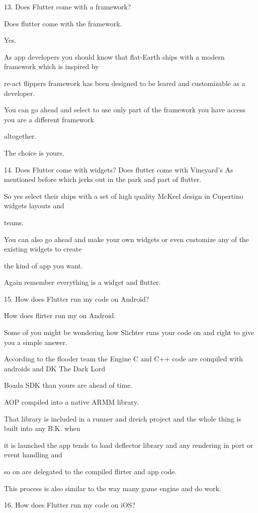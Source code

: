 13. Does Flutter come with a framework?

Does flutter come with the framework.

Yes.

As app developers you should know that flat-Earth ships with a modern framework which is inspired by

re-act flippers framework has been designed to be leared and customizable as a developer.

You can go ahead and select to use only part of the framework you have access you are a different framework

altogether.

The choice is yours.


14. Does Flutter come with widgets?
Does flutter come with Vineyard's As mentioned before which jerks out in the park and part of flutter.

So yes select their ships with a set of high quality McKeel design in Cupertino widgets layouts and

teams.

You can also go ahead and make your own widgets or even customize any of the existing widgets to create

the kind of app you want.

Again remember everything is a widget and flutter.


15. How does Flutter run my code on Android?

How does flirter run my on Android.

Some of you might be wondering how Slichter runs your code on and right to give you a simple answer.

According to the flooder team the Engine C and C++ code are compiled with androids and DK The Dark Lord

Boada SDK than yours are ahead of time.

AOP compiled into a native ARMM library.

That library is included in a runner and dreich project and the whole thing is built into any B.K. when

it is launched the app tends to load deflector library and any rendering in port or event handling and

so on are delegated to the compiled flirter and app code.

This process is also similar to the way many game engine and do work.


16. How does Flutter run my code on iOS?

